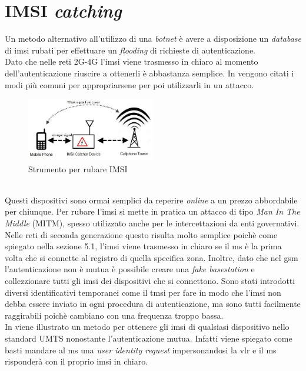 \section{IMSI \textit{catching}}
Un metodo alternativo all'utilizzo di una \textit{botnet} è avere a disposizione un \textit{database} di \gls{imsi} rubati per effettuare un \textit{flooding} di richieste di autenticazione.\\
Dato che nelle reti 2G-4G l'\gls{imsi} viene trasmesso in chiaro al momento dell'autenticazione riuscire a ottenerli è abbastanza semplice.
In \cite{imsi-catcher} vengono citati i modi più comuni per appropriarsene per poi utilizzarli in un 
attacco.
\begin{figure}[h]
    \centering
    \includegraphics[width=0.5\textwidth]{images/imsi-catcher.jpg}
    \caption{Strumento per rubare IMSI}
\end{figure}\\
Questi dispositivi sono ormai semplici da reperire \textit{online} a un prezzo abbordabile per chiunque. Per rubare l'\gls{imsi} si mette in pratica un attacco di tipo \textit{Man In The Middle} (MITM), spesso utilizzato
anche per le intercettazioni da enti governativi.\\
Nelle reti di seconda generazione questo risulta molto semplice poichè come spiegato nella sezione 5.1, l'\gls{imsi} viene trasmesso in chiaro se il \gls{ms} è la prima volta che si connette al registro di quella specifica
zona. Inoltre, dato che nel \gls{gsm} l'autenticazione non è mutua è possibile creare una \textit{fake basestation} e collezzionare tutti gli \gls{imsi} dei dispositivi che si connettono.
Sono stati introdotti diversi identificativi temporanei come il \gls{tmsi} per fare in modo che l'\gls{imsi} non debba essere inviato in ogni procedura di autenticazione, ma sono tutti facilmente raggirabili poichè cambiano con una
frequenza troppo bassa.\\
In \cite{dos-imsi} viene illustrato un metodo per ottenere gli \gls{imsi} di qualsiasi dispositivo nello standard UMTS nonostante l'autenticazione mutua. Infatti viene spiegato come basti mandare al \gls{ms} una \textit{user identity request} impersonandosi 
la \gls{vlr} e il \gls{ms} risponderà con il proprio \gls{imsi} in chiaro.
